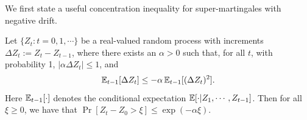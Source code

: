 \medskip
{} 
We first state a
useful concentration inequality for super-martingales with negative drift.
\begin{lemma}\label{fact:freedman_conc}
Let $\{Z_t: t = 0,1, \cdots\}$ be a real-valued random process with increments $\Delta Z_t := Z_t - Z_{t-1}$, where %
there exists an $\alpha> 0$ such that, for all $t$, with probability 1, $|\alpha \Delta Z_t| \leq 1$, and %
\[
\mathbb{E}_{t-1}[\Delta Z_t] \leq - \alpha\, \mathbb{E}_{t-1}[(\Delta Z_t)^2].
\] Here $\mathbb{E}_{t-1}[\cdot]$ denotes the conditional expectation $\mathbb{E}[\cdot | Z_1, \cdots, Z_{t-1}]$. Then for all $\xi \geq 0$, we have that   
$
\Pr[ Z_t - Z_0 > \xi ] \leq \exp(- \alpha \xi).$
\end{lemma}
